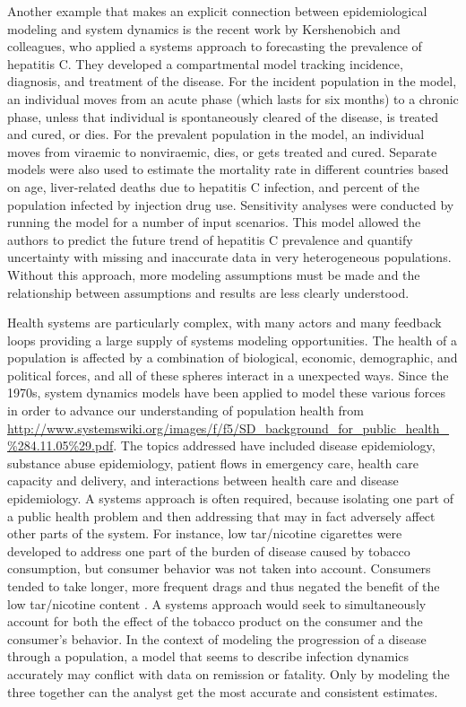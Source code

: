 Another example that makes an explicit connection between
epidemiological modeling and system dynamics is the recent work by
Kershenobich and colleagues, who applied a systems approach to
forecasting the prevalence of hepatitis C. They developed a
compartmental model tracking incidence, diagnosis, and treatment of the
disease. For the incident population in the model, an individual moves
from an acute phase (which lasts for six months) to a chronic phase,
unless that individual is spontaneously cleared of the disease, is
treated and cured, or dies. For the prevalent population in the model,
an individual moves from viraemic to nonviraemic, dies, or gets
treated and cured. Separate models were also used to estimate the
mortality rate in different countries based on age, liver-related
deaths due to hepatitis C infection, and percent of the population
infected by injection drug use. Sensitivity analyses were conducted
by running the model for a number of input scenarios.  This model allowed the authors to predict the future trend of hepatitis C prevalence and quantify uncertainty with missing and inaccurate data in very heterogeneous populations.  Without this approach, more modeling assumptions must be made and the relationship between assumptions and results are less clearly understood. \cite{kershenobich_applying_2011}

Health systems are particularly complex, with many actors and many
feedback loops providing a large supply of systems modeling
opportunities. The health of a population is affected by a combination
of biological, economic, demographic, and political forces, and all of
these spheres interact in a unexpected ways. Since the 1970s, system
dynamics models have been applied to model these various forces in
order to advance our understanding of population health \cite{refs}
from
\url{http://www.systemswiki.org/images/f/f5/SD_background_for_public_health_%284.11.05%29.pdf}. The
  topics addressed have included disease epidemiology, substance
  abuse epidemiology, patient flows in emergency care, health care
  capacity and delivery, and interactions between health care and
  disease epidemiology. A systems approach is often required, because
  isolating one part of a public health problem and then addressing
  that may in fact adversely affect other parts of the system. For
  instance, low tar/nicotine cigarettes were developed to address one
  part of the burden of disease caused by tobacco consumption, but
  consumer behavior was not taken into account. Consumers tended to
  take longer, more frequent drags and thus negated the benefit of the
  low tar/nicotine content \cite{Sterman_Learning_2006}. A systems
  approach would seek to simultaneously account for both the effect of
  the tobacco product on the consumer and the consumer's behavior. In
  the context of modeling the progression of a disease through a
  population, a model that seems to describe infection dynamics
  accurately may conflict with data on remission or fatality. Only by
  modeling the three together can the analyst get the most accurate
  and consistent estimates.

